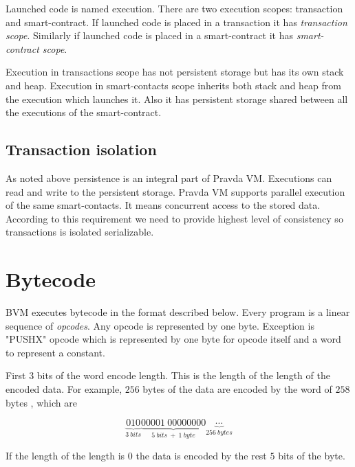 \documentclass[12pt,a4paper]{article}
\begin{document}
Launched code is named execution. There are two execution scopes: transaction and smart-contract. If launched code is placed in a transaction it has \textit{transaction scope}. Similarly if launched code is placed in a smart-contract it has \textit{smart-contract scope}.

Execution in transactions scope has not persistent storage but has its own stack and heap. Execution in smart-contacts scope inherits both stack and heap from the execution which launches it. Also it has persistent storage shared between all the executions of the smart-contract.

\subsection{Transaction isolation}

As noted above persistence is an integral part of Pravda VM. Executions can read and write to the persistent storage. Pravda VM supports parallel execution of the same smart-contacts. It means concurrent access to the stored data. According to this requirement we need to provide highest level of consistency so transactions is isolated serializable\cite{transaction-isolation}. 

\section{Bytecode}

BVM executes bytecode in the format described below. Every program is a linear sequence of \textit{opcodes}. Any opcode is represented by one byte. Exception is "PUSHX" opcode which is represented by one byte for opcode itself and a word to represent a constant.

First 3 bits of the word encode length. This is the length of the length of the encoded data. For example, $256$ bytes of the data are encoded by the word of $258$ bytes , which are

$$\underbrace{010}_{3~bits}\underbrace{00001~00000000}_{5~bits~+~1~byte} \underbrace{\cdots}_{256~bytes} $$

If the length of the length is 0 the data is encoded by the rest $5$ bits of the byte.
\end{document}
